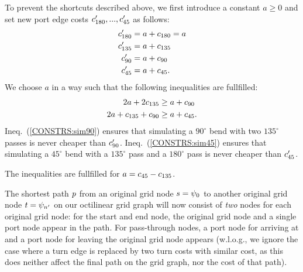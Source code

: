 \documentclass{sig-alternate-sigmod09}
\begin{document}
To prevent the shortcuts described above, we first introduce a constant $a \geq 0$ and set new port edge costs $c'_{180}, ..., c'_{45}$ as follows:
%
\begin{align}
	c'_{180} &= a + c_{180} = a \\
	c'_{135} &= a + c_{135} \\
	c'_{90} &= a + c_{90} \\
	c'_{45} &= a + c_{45}.
\end{align}
%
We choose $a$ in a way such that the following inequalities are fullfilled:
%
\begin{align}
	2a + 2c_{135} &\geq a + c_{90} \label{CONSTRS:sim90}\\
	2a + c_{135} + c_{90} &\geq a + c_{45}\label{CONSTRS:sim45}.
\end{align}
Ineq.~(\ref{CONSTRS:sim90}) ensures that simulating a $90^{\circ}$ bend with two $135^{\circ}$ passes is never cheaper than $c'_{90}$.
Ineq.~(\ref{CONSTRS:sim45}) ensures that simulating a $45^{\circ}$ bend with a $135^{\circ}$ pass and a $180^{\circ}$ pass is never cheaper than $c'_{45}$.

The inequalities are fullfilled for $a = c_{45} - c_{135}$.

The shortest path $p$ from an original grid node $s = \psi_0$ to another original grid node $t=\psi_{n'}$ on our octilinear grid graph will now consist of \emph{two} nodes for each original grid node: for the start and end node, the original grid node and a single port node appear in the path.
For pass-through nodes, a port node for arriving at and a port node for leaving the original grid node appears (w.l.o.g., we ignore the case where a turn edge is replaced by two turn costs with similar cost, as this does neither affect the final path on the grid graph, nor the cost of that path).
\end{document}
